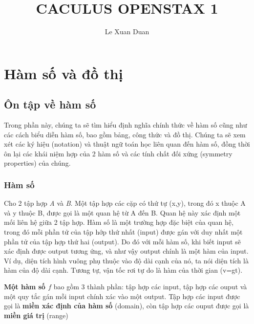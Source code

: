 \documentclass[a4paper,12pt,openany]{book}
\title{CACULUS OPENSTAX 1}
\author{Le Xuan Duan}
\begin{document}
\maketitle 

\chapter{Hàm số và đồ thị}

\section{Ôn tập về hàm số}

Trong phần này, chúng ta sẽ tìm hiểu định nghĩa chính thức về hàm số cũng như các cách biểu diễn hàm số, bao gồm bảng, công thức và đồ thị. Chúng ta sẽ xem xét các ký hiệu (notation) và thuật ngữ toán học liên quan đến hàm số, đồng thời ôn lại các khái niệm hợp của 2 hàm số và các tính chất đối xứng (symmetry properties) của chúng. 

\subsection{Hàm số}

Cho 2 tập hợp \textit{A} và \textit{B}. Một tập hợp các cặp có thứ tự (x,y), trong đó x thuộc A và y thuộc B, được gọi là một quan hệ từ A đến B. Quan hệ này xác định một mối liên hệ giữa 2 tập hợp. Hàm số là một trường hợp đặc biệt của quan hệ, trong đó mỗi phần tử của tập hớp thứ nhất (input) được gán với duy nhất một phần tử của tập hợp thứ hai (output). Do đó với mỗi hàm số, khi biết input sẽ xác định được output tương ứng, và như vậy output chính là một hàm của input. Ví dụ, diện tích hình vuông phụ thuộc vào độ dài cạnh của nó, ta nói diện tích là hàm của độ dài cạnh. Tương tự, vận tốc rơi tự do là hàm của thời gian (v=gt).   

\vspace{13pt}
\begin{tcolorbox}[
    colframe=blue!10,      %
    colback=blue!5,    %
    coltitle=black,     %
    fonttitle=\bfseries,%
    title=Định nghĩa    %
    ]
\textbf{Một hàm số $f$} bao gồm 3 thành phần: tập hợp các input, tập hợp các ouput và một quy tắc gán mỗi input chính xác vào một output. Tập hợp các input được gọi là \textbf{miền xác định của hàm số} (domain), còn tập hợp các ouput được gọi là \textbf{miền giá trị} (range)  
\end{tcolorbox}
\end{document}
